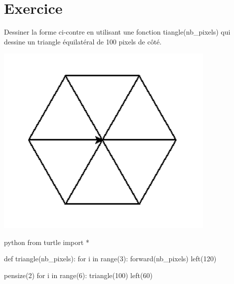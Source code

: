 \documentclass[a4paper,11pt]{article}
\begin{document}
\section{Exercice}
\begin{multicols}{2}
Dessiner la forme ci-contre en utilisant une fonction tiangle(nb_pixels) qui dessine un triangle équilatéral de 100 pixels de côté.
\begin{center}
\includegraphics[width=0.8\textwidth]{images/Hexagone.png}\\
\end{center}
\end{multicols}

\begin{solution}
\begin{code}{python}
from turtle import *

def triangle(nb_pixels):
    for i in range(3):
        forward(nb_pixels)
        left(120)

pensize(2)
for i in range(6):
    triangle(100)
    left(60)
\end{code}
\end{solution}
\end{document}
